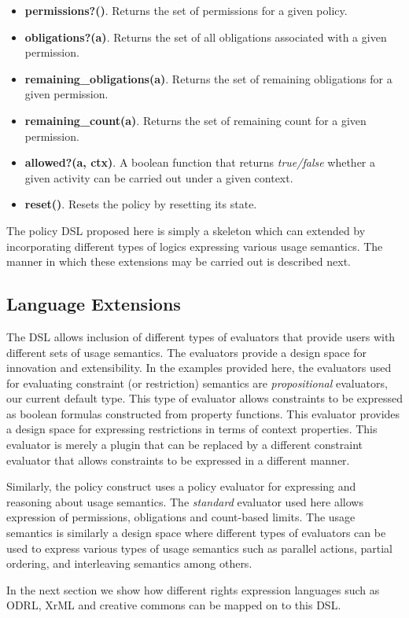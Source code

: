 \begin{itemize}
\item {\bf permissions?()}. Returns the set of permissions for a given policy.
\item {\bf obligations?(a)}. Returns the set of all obligations associated with a given permission. 
\item {\bf remaining\_obligations(a)}. Returns the set of remaining obligations for a given permission. 
\item {\bf remaining\_count(a)}. Returns the set of remaining count for a given permission. 
\item {\bf allowed?(a, ctx)}. A boolean function that returns {\em true/false} whether a given activity can be carried out under a given context. 
\item {\bf reset()}. Resets the policy by resetting its state. 
\end{itemize}

The policy DSL proposed here is simply a skeleton which can extended by incorporating different types of logics expressing various usage semantics. The manner in which these extensions may be carried out is described next. 

\subsection{Language Extensions}

The DSL allows inclusion of different types of evaluators that provide users with different sets of usage semantics. The evaluators provide a design space for innovation and extensibility. In the examples provided here, the evaluators used for evaluating constraint (or restriction) semantics are {\em propositional} evaluators, our current default type. This type of evaluator allows constraints to be expressed as boolean formulas constructed from property functions. This evaluator provides a design space for expressing restrictions in terms of context properties. This evaluator is merely a plugin that can be replaced by a different constraint evaluator that allows constraints to be expressed in a different manner. 

Similarly, the policy construct uses a policy evaluator for expressing and reasoning about usage semantics. The {\em standard} evaluator used here allows expression of permissions, obligations and count-based limits. The usage semantics is similarly a design space where different types of evaluators can be used to express various types of usage semantics such as parallel actions, partial ordering, and interleaving semantics among others.

In the next section we show how different rights expression languages such as ODRL, XrML and creative commons can be mapped on to this DSL. 